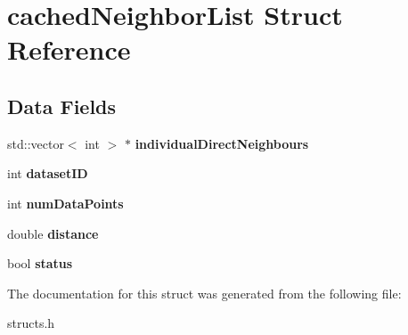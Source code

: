 \hypertarget{structcachedNeighborList}{\section{cached\-Neighbor\-List Struct Reference}
\label{structcachedNeighborList}
}
\subsection*{Data Fields}
\begin{DoxyCompactItemize}
\item 
\hypertarget{structcachedNeighborList_a22b63afcc7435a1259a51a7e8aff8bb2}{std\-::vector$<$ int $>$ $\ast$ {\bfseries individual\-Direct\-Neighbours}}\label{structcachedNeighborList_a22b63afcc7435a1259a51a7e8aff8bb2}

\item 
\hypertarget{structcachedNeighborList_a2c58626dfbc5d6e5f64669b959059657}{int {\bfseries dataset\-I\-D}}\label{structcachedNeighborList_a2c58626dfbc5d6e5f64669b959059657}

\item 
\hypertarget{structcachedNeighborList_aedb027cd61fdd23093b769ac7863f2b5}{int {\bfseries num\-Data\-Points}}\label{structcachedNeighborList_aedb027cd61fdd23093b769ac7863f2b5}

\item 
\hypertarget{structcachedNeighborList_aebdea75daf34e31ca980c335552772d1}{double {\bfseries distance}}\label{structcachedNeighborList_aebdea75daf34e31ca980c335552772d1}

\item 
\hypertarget{structcachedNeighborList_a4a5a0b34bc2258b911dc5c214cfda466}{bool {\bfseries status}}\label{structcachedNeighborList_a4a5a0b34bc2258b911dc5c214cfda466}

\end{DoxyCompactItemize}


The documentation for this struct was generated from the following file\-:\begin{DoxyCompactItemize}
\item 
structs.\-h\end{DoxyCompactItemize}
